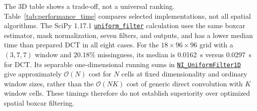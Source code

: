 \documentclass[a4paper,fleqn]{cas-sc}
\begin{document}
The 3D table shows a trade-off, not a universal ranking. Table~\ref{tab:performance_time} compares selected implementations, not all spatial algorithms. The SciPy 1.17.1 \href{https://github.com/scipy/scipy/blob/v1.17.1/scipy/ndimage/_filters.py\#L1550-L1618}{\texttt{uniform\_filter}} calculation uses the same boxcar estimator, mask normalization, seven filters, and outputs, and has a lower median time than prepared DCT in all eight cases. For the $18\times96\times96$ grid with a $(3,7,7)$ window and 20.18\% missingness, its median is 0.0162~s versus 0.0297~s for DCT. Its separable one-dimensional running sums in \href{https://github.com/scipy/scipy/blob/v1.17.1/scipy/ndimage/src/ni_filters.c\#L311-L374}{\texttt{NI\_UniformFilter1D}} give approximately $\mathcal{O}(N)$ cost for $N$ cells at fixed dimensionality and ordinary window sizes, rather than the $\mathcal{O}(NK)$ cost of generic direct convolution with $K$ window cells. These timings therefore do not establish superiority over optimized spatial boxcar filtering.
\end{document}
